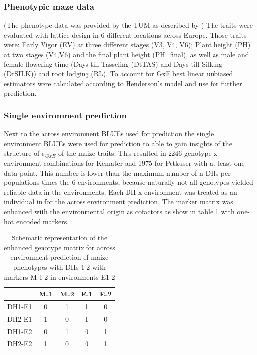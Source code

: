 \subsubsection{Phenotypic maze data}
(The phenotype data was provided by the TUM as described by \cite{holker2019european}) \newline The traits
were evaluated with lattice design in 6 different locations across Europe.  Those traits were: Early Vigor
(EV) at three different stages (V3, V4, V6); Plant height (PH) at two stages (V4,V6) and the final plant
height (PH\_final), as well as male and female flowering time (Days till Tasseling (DtTAS) and Days till
Silking (DtSILK)) and root lodging (RL).  To account for GxE best linear unbiased estimators were calculated
according to Henderson's model \cite{henderson1975best} and use for further prediction.

\subsubsection{Single environment prediction}
Next to the across environment BLUEs used for prediction the single environment BLUEs were used for prediction
to able to gain insights of the structure of $\sigma_{GxE}$ of the maize traits. This resulted in 2246
genotype x environment combinations for Kemater and 1975 for Petkuser with at least one data point.  This
number is lower than the maximum number of n DHs per populations times the 6 environments, because naturally
not all genotypes yielded reliable data in the environments. Each DH x environment was treated as an
individual in for the across environment prediction. The marker matrix was enhanced with the environmental
origin as cofactors as show in table \ref{tab:envmarker} with one-hot encoded markers.

\onehalfspacing
\begin{table}[H]
  \centering
  \caption{Schematic representation of the enhanced genotype matrix for across environment prediction of maize phenotypes with DHs 1-2 with markers M 1-2 in environments E1-2}
  \label{tab:envmarker}
  \begin{tabular}{l|cccc}
    \toprule
           & M-1 & M-2 & E-1 & E-2 \\
    \midrule
    DH1-E1 & 0   & 1   & 1   & 0   \\
    DH2-E1 & 1   & 0   & 1   & 0   \\
    DH1-E2 & 0   & 1   & 0   & 1   \\
    DH2-E2 & 1   & 0   & 0   & 1   \\                                           
    \bottomrule
  \end{tabular}
\end{table}
\doublespacing



